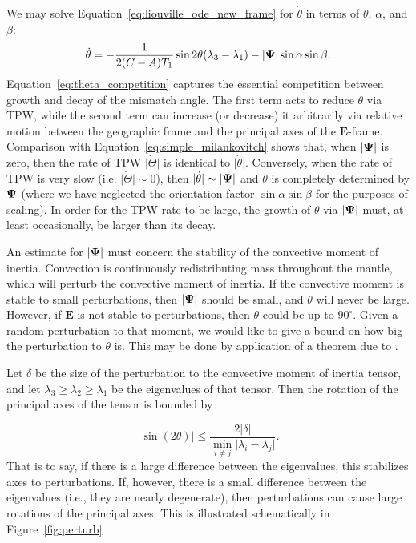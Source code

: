 \documentclass[extra,mreferee]{gji}
\begin{document}
We may solve Equation~\eqref{eq:liouville_ode_new_frame} for $\dot{\theta}$ in terms of $\theta$, $\alpha$, and $\beta$:
\begin{equation}
\dot{\theta} = 
-\frac{1}{2(C-A) T_1}\sin{2\theta} ( \lambda_3 - \lambda_1) - \vert \mitbf{\Psi} \vert \sin\alpha \sin\beta.
\label{eq:theta_competition}
\end{equation}
Equation~\eqref{eq:theta_competition} captures the essential competition between growth and decay of the mismatch angle.
The first term acts to reduce $\theta$ via TPW, while the second term can increase (or decrease) it arbitrarily via
relative motion between the geographic frame and the principal axes of the $\mathbf{E}$-frame.
Comparison with Equation~\eqref{eq:simple_milankovitch} shows that, when $\vert \mitbf{\Psi} \vert$ is zero,
then the rate of TPW $\vert \dot{\Theta} \vert$ is identical to $\vert \dot{\theta} \vert$.
Conversely, when the rate of TPW is very slow (i.e. $\vert \dot{\Theta} \vert \sim 0$), 
then $\vert \dot{\theta} \vert \sim \vert \mitbf{\Psi} \vert$ 
and $\theta$ is completely determined by $\mitbf{\Psi}$
(where we have neglected the orientation factor $\sin \alpha \sin \beta$ for the purposes of scaling).
In order for the TPW rate to be large, the growth of $\theta$ via $\vert \mitbf{\Psi} \vert$ must, 
at least occasionally, be larger than its decay.

An estimate for $\vert \mitbf{\Psi} \vert$ must concern the stability of the convective moment of inertia. 
Convection is continuously redistributing mass throughout the mantle, which will perturb the convective moment of inertia.  
If the convective moment is stable to small perturbations, then $\vert \mitbf{\Psi} \vert$ should be small, 
and $\theta$ will never be large.
However, if $\mathbf{E}$ is not stable to perturbations, then $\theta$ could be up to $90^\circ$. 
Given a random perturbation to that moment, we would like to give a bound on how big the perturbation to $\theta$ is. 
This may be done by application of a theorem due to \citet{davis1970rotation}.

Let $\delta$ be the size of the perturbation to the convective moment of inertia tensor, and let $\lambda_3 \ge \lambda_2 \ge \lambda_1$ be the eigenvalues of that tensor.  
Then the rotation of the principal axes of the tensor is bounded by

\begin{equation}
\vert \sin(2 \theta) \vert \le \frac{ 2 \vert \delta \vert}{ \displaystyle \min_{i \neq j} \vert \lambda_i - \lambda_j \vert }.
\label{eq:kahan}
\end{equation} 
That is to say, if there is a large difference between the eigenvalues, this stabilizes axes to perturbations.  
If, however, there is a small difference between the eigenvalues (i.e., they are nearly degenerate), then perturbations can cause large rotations of the principal axes.
This is illustrated schematically in Figure~\ref{fig:perturb}
\end{document}
